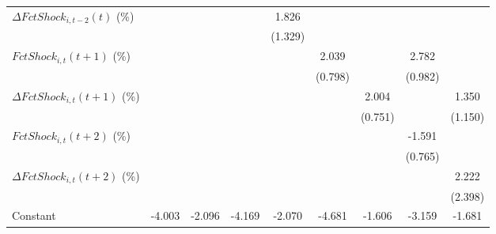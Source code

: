 {\begin{tabular}{l*{8}{c}}
\addlinespace
$ \Delta FctShock_{i,t-2}(t)$ (\%)&                     &                     &                     &       1.826         &                     &                     &                     &                     \\
                    &                     &                     &                     &     (1.329)         &                     &                     &                     &                     \\
\addlinespace
$ FctShock_{i,t}(t+1)$ (\%)&                     &                     &                     &                     &       2.039\sym{**} &                     &       2.782\sym{**} &                     \\
                    &                     &                     &                     &                     &     (0.798)         &                     &     (0.982)         &                     \\
\addlinespace
$ \Delta FctShock_{i,t}(t+1)$ (\%)&                     &                     &                     &                     &                     &       2.004\sym{**} &                     &       1.350         \\
                    &                     &                     &                     &                     &                     &     (0.751)         &                     &     (1.150)         \\
\addlinespace
$ FctShock_{i,t}(t+2)$ (\%)&                     &                     &                     &                     &                     &                     &      -1.591\sym{*}  &                     \\
                    &                     &                     &                     &                     &                     &                     &     (0.765)         &                     \\
\addlinespace
$ \Delta FctShock_{i,t}(t+2)$ (\%)&                     &                     &                     &                     &                     &                     &                     &       2.222         \\
                    &                     &                     &                     &                     &                     &                     &                     &     (2.398)         \\
\addlinespace
Constant            &      -4.003\sym{***}&      -2.096\sym{***}&      -4.169\sym{***}&      -2.070\sym{***}&      -4.681\sym{***}&      -1.606\sym{***}&      -3.159\sym{***}&      -1.681\sym{**} \\

\end{tabular}}

